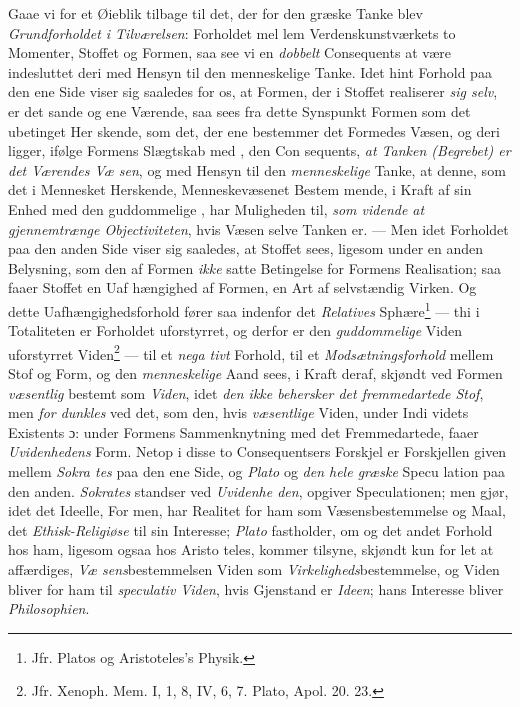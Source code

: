 Gaae vi for et Øieblik tilbage til det, der for den græske
Tanke blev \emph{Grundforholdet i Tilværelsen}: Forholdet mel\-%
lem Verdenskunstværkets to Momenter, Stoffet og Formen,
saa see vi en \emph{dobbelt} Consequents at være indesluttet deri
med Hensyn til den menneskelige Tanke. Idet hint Forhold
paa den ene Side viser sig saaledes for os, at Formen, der
i Stoffet realiserer \emph{sig selv}, er det sande og ene Værende,
saa sees fra dette Synspunkt Formen som det ubetinget Her\-%
skende, som det, der ene bestemmer det Formedes Væsen,
og deri ligger, ifølge Formens Slægtskab med , den Con\-%
sequents, \emph{at Tanken (Begrebet) er det Værendes Væ\-%
sen}, og med Hensyn til den \emph{menneskelige} Tanke, at denne,
som det i Mennesket Herskende, Menneskevæsenet Bestem\-%
\setcounter{footnote}{0}%
mende, i Kraft af sin Enhed med den guddommelige ,
har Muligheden til, \emph{som vidende at gjennemtrænge
Objectiviteten}, hvis Væsen selve Tanken er. --- Men idet
Forholdet paa den anden Side viser sig saaledes, at Stoffet sees,
ligesom under en anden Belysning, som den af Formen \emph{ikke}
satte Betingelse for Formens Realisation; saa faaer Stoffet en Uaf\-%
hængighed af Formen, en Art af selvstændig Virken. Og dette
Uafhængighedsforhold fører saa indenfor det \emph{Relatives} Sphære\footnote{Jfr.
Platos og Aristoteles's Physik.}
--- thi i Totaliteten er Forholdet uforstyrret, og derfor er den
\emph{guddommelige} Viden uforstyrret Viden\footnote{Jfr. Xenoph. Mem.
I, 1, 8, IV, 6, 7. Plato, Apol. 20. 23.} --- til et \emph{nega\-%
tivt} Forhold, til et \emph{Modsætningsforhold} mellem Stof og
Form, og den \emph{menneskelige} Aand sees, i Kraft deraf,
skjøndt ved Formen \emph{væsentlig} bestemt som \emph{Viden}, idet
\emph{den ikke behersker det fremmedartede Stof}, men \emph{for\-%
dunkles} ved det, som den, hvis \emph{væsentlige} Viden, under Indi\-%
videts Existents ɔ: under Formens Sammenknytning med det
Fremmedartede, faaer \emph{Uvidenhedens} Form. Netop i disse to
Consequentsers Forskjel er Forskjellen given mellem \emph{Sokra\-%
tes} paa den ene Side, og \emph{Plato} og \emph{den hele græske} Specu\-%
lation paa den anden. \emph{Sokrates} standser ved \emph{Uvidenhe\-%
den}, opgiver Speculationen; men gjør, idet det Ideelle, For\-%
men, har Realitet for ham som Væsensbestemmelse og Maal,
det \emph{Ethisk-Religiøse} til sin Interesse; \emph{Plato} fastholder,
om og det andet Forhold hos ham, ligesom ogsaa hos Aristo\-%
teles, kommer tilsyne, skjøndt kun for let at affærdiges, \emph{Væ\-%
sens}bestemmelsen Viden som \emph{Virkeligheds}bestemmelse, og
Viden bliver for ham til \emph{speculativ Viden}, hvis Gjenstand
er \emph{Ideen}; hans Interesse bliver \emph{Philosophien}.

